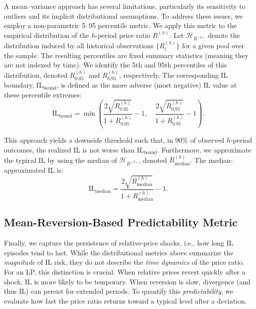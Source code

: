 \documentclass[journal]{IEEEtran}
\begin{document}
A mean--variance approach has several limitations, particularly its sensitivity to outliers and its implicit distributional assumptions. 
To address these issues, we employ a non-parametric 5--95 percentile metric.
We apply this metric to the empirical distribution of the $h$-period price ratio $R^{(h)}$.
Let $\mathcal{H}_{R^{(h)}}$ denote the distribution induced by all historical observations $\{R^{(h)}_t\}$ for a given pool over the sample. The resulting percentiles are fixed summary statistics (meaning they are not indexed by time).
We identify the 5th and 95th percentiles of this distribution, denoted $R^{(h)}_{0.05}$ and $R^{(h)}_{0.95}$, respectively.
The corresponding IL boundary, $\mathrm{IL}_{\text{bound}}$, is defined as the more adverse (most negative) IL value at these percentile extremes:
\begin{equation}
\label{eq:il_bound}
\mathrm{IL}_{\text{bound}} = \min\left(
\frac{2\sqrt{R^{(h)}_{0.05}}}{1+R^{(h)}_{0.05}} - 1,\quad
\frac{2\sqrt{R^{(h)}_{0.95}}}{1+R^{(h)}_{0.95}} - 1
\right).
\end{equation}

This approach yields a downside threshold such that, in 90\% of observed $h$-period outcomes, the realized IL is not worse than $\mathrm{IL}_{\text{bound}}$.
Furthermore, we approximate the typical IL by using the median of \(\mathcal{H}_{R^{(h)}}\), denoted \(R^{(h)}_{\text{median}}\). The median-approximated IL is:
\begin{equation}
\label{eq:il_median}
\mathrm{IL}_{\text{median}} = \frac{2\sqrt{R^{(h)}_{\text{median}}}}{1+R^{(h)}_{\text{median}}} - 1.
\end{equation}

\subsection{Mean-Reversion-Based Predictability Metric}
\label{subsubsec:mean_reversion_metric}

Finally, we capture the persistence of relative-price shocks, i.e., how long IL episodes tend to last.
While the distributional metrics above summarize the \emph{magnitude} of IL risk, they do not describe the \emph{time dynamics} of the price ratio.
For an LP, this distinction is crucial. When relative prices revert quickly after a shock, IL is more likely to be temporary. When reversion is slow, divergence (and thus IL) can persist for extended periods.
To quantify this \emph{predictability}, we evaluate how fast the price ratio returns toward a typical level after a deviation. 
\end{document}
